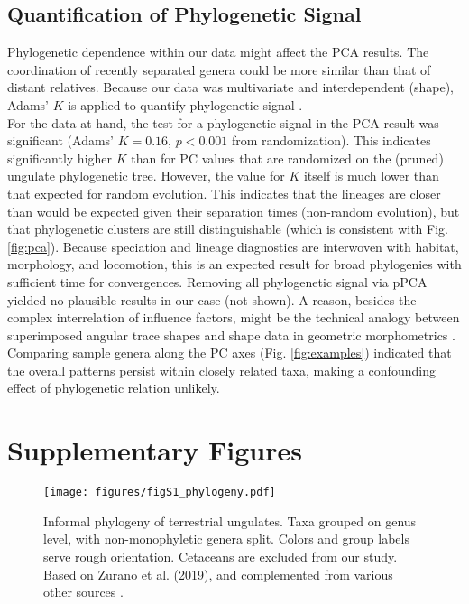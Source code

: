 \subsection{Quantification of Phylogenetic Signal}\label{apdx:phylosig}
Phylogenetic dependence within our data might affect the PCA results.
The coordination of recently separated genera could be more similar than that of distant relatives.
Because our data was multivariate and interdependent (shape), Adams' $K$ is applied to quantify phylogenetic signal \cite{Adams2014}.
\\For the data at hand, the test for a phylogenetic signal in the PCA result was significant (Adams' $K=0.16$, $p < 0.001$ from randomization).
This indicates significantly higher $K$ than for PC values that are randomized on the (pruned) ungulate phylogenetic tree.
However, the value for $K$ itself is much lower than that expected for random evolution.
This indicates that the lineages are closer than would be expected given their separation times (non-random evolution), but that phylogenetic clusters are still distinguishable (which is consistent with Fig. \ref{fig:pca}).
Because speciation and lineage diagnostics are interwoven with habitat, morphology, and locomotion, this is an expected result for broad phylogenies with sufficient time for convergences.
Removing all phylogenetic signal via pPCA \cite{Revell2009} yielded no plausible results in our case (not shown).
A reason, besides the complex interrelation of influence factors, might be the technical analogy between superimposed angular trace shapes and shape data in geometric morphometrics \cite[\textit{cf.}][]{Polly2013}.
Comparing sample genera along the PC axes (Fig. \ref*{fig:examples}) indicated that the overall patterns persist within closely related taxa, making a confounding effect of phylogenetic relation unlikely.



\newpage
\section{Supplementary Figures}

\begin{figure}[h!]
\centering
\texttt{[image: figures/figS1\_phylogeny.pdf]}
\caption{Informal phylogeny of terrestrial ungulates. Taxa grouped on genus level, with non-monophyletic genera split. Colors and group labels serve rough orientation. Cetaceans are excluded from our study.
Based on Zurano et al. (2019), and complemented from various other sources \citep{Zurano2019,ParisiDutra2017,Frantz2015,Ryder2011,Price2009,Gongora2011,Funk2007,Hassanin2012}.
 }
\label{fig:phylogeny}
\end{figure}


